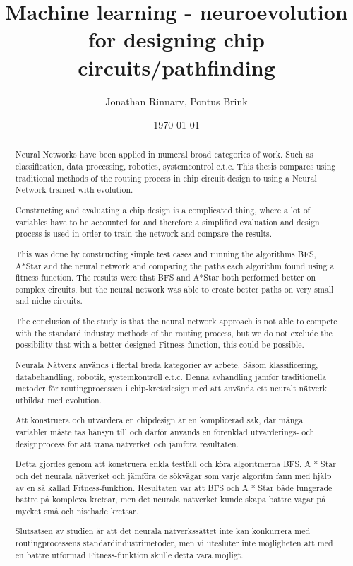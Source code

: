 \documentclass{kththesis}
\title{Machine learning - neuroevolution for designing chip circuits/pathfinding}
\author{Jonathan Rinnarv, Pontus Brink}
\date{\today}
\begin{document}

 
\frontmatter
 
\titlepage
 
\begin{abstract}
Neural Networks have been applied in numeral broad categories of work. Such as classification, data processing, robotics, systemcontrol e.t.c. This thesis compares using traditional methods of the routing process in chip circuit design to using a Neural Network trained with evolution.
 
Constructing and evaluating a chip design is a complicated thing, where a lot of variables have to be accounted for and therefore a simplified evaluation and design process is used in order to train the network and compare the results. 
 
This was done by constructing simple test cases and running the algorithms BFS, A*Star and the neural network and comparing the paths each algorithm found using a fitness function. The results were that BFS and A*Star both performed better on complex circuits, but the neural network was able to create better paths on very small and niche circuits. 
 
The conclusion of the study is that the neural network approach is not able to compete with the standard industry methods of the routing process, but we do not exclude the possibility that with a better designed Fitness function, this could be possible.
\end{abstract}
 
 
\begin{otherlanguage}{swedish}
  \begin{abstract}
   Neurala Nätverk används i flertal breda kategorier av arbete. Såsom klassificering, databehandling, robotik, systemkontroll e.t.c. Denna avhandling jämför traditionella metoder för routingprocessen i chip-kretsdesign med att använda ett neuralt nätverk utbildat med evolution.
 
Att konstruera och utvärdera en chipdesign är en komplicerad sak, där många variabler måste tas hänsyn till och därför används en förenklad utvärderings- och designprocess för att träna nätverket och jämföra resultaten.
 
Detta gjordes genom att konstruera enkla testfall och köra algoritmerna BFS, A * Star och det neurala nätverket och jämföra de sökvägar som varje algoritm fann med hjälp av en så kallad Fitness-funktion. Resultaten var att BFS och A * Star både fungerade bättre på komplexa kretsar, men det neurala nätverket kunde skapa bättre vägar på mycket små och nischade kretsar.
 
 
Slutsatsen av studien är att det neurala nätverkssättet inte kan konkurrera med routingprocessens standardindustrimetoder, men vi utesluter inte möjligheten att med en bättre utformad Fitness-funktion skulle detta vara möjligt.
  \end{abstract}
\end{otherlanguage}
 
\end{document}
